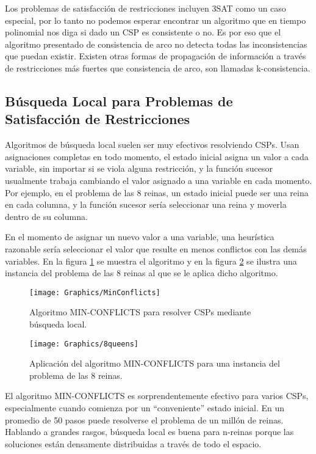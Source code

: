 Los problemas de satisfacci\'on de restricciones incluyen 3SAT como un caso especial, por lo tanto no podemos esperar encontrar un algoritmo que en tiempo polinomial nos diga si dado un CSP es consistente o no. Es por eso que el algoritmo presentado de consistencia de arco no detecta todas las inconsistencias que puedan existir. Existen otras formas de propagaci\'on de informaci\'on a trav\'es de restricciones m\'as fuertes que consistencia de arco, son llamadas k-consistencia.

\subsection{B\'usqueda Local para Problemas de Satisfacci\'on de Restricciones}

Algoritmos de b\'usqueda local suelen ser muy efectivos resolviendo CSPs. Usan asignaciones completas en todo momento, el estado inicial asigna un valor a cada variable, sin importar si se viola alguna restricci\'on, y la funci\'on sucesor usualmente trabaja cambiando el valor asignado a una variable en cada momento. Por ejemplo, en el problema de las 8 reinas, un estado inicial puede ser una reina en cada columna, y la funci\'on sucesor ser\'ia seleccionar una reina y moverla dentro de su columna.

En el momento de asignar un nuevo valor a una variable, una heur\'istica razonable ser\'ia seleccionar el valor que resulte en menos conflictos con las dem\'as variables. En la figura \ref{MinConflicts} se muestra el algoritmo y en la figura \ref{8queens} se ilustra una instancia del problema de las 8 reinas al que se le aplica dicho algoritmo.

\begin{figure}
	\begin{center}
		\texttt{[image: Graphics/MinConflicts]}
		\caption{Algoritmo MIN-CONFLICTS para resolver CSPs mediante b\'usqueda local.}
		\label{MinConflicts}
	\end{center}	
\end{figure}

\begin{figure}
	\begin{center}
		\texttt{[image: Graphics/8queens]}
		\caption{Aplicaci\'on del algoritmo MIN-CONFLICTS para una instancia del problema de las 8 reinas.}
		\label{8queens}
	\end{center}	
\end{figure}

El algoritmo MIN-CONFLICTS es sorprendentemente efectivo para varios CSPs, especialmente cuando comienza por un ``conveniente'' estado inicial. En un promedio de 50 pasos puede resolverse el problema de un mill\'on de reinas. Hablando a grandes rasgos, b\'usqueda local es buena para n-reinas porque las soluciones est\'an densamente distribuidas a trav\'es de todo el espacio.

